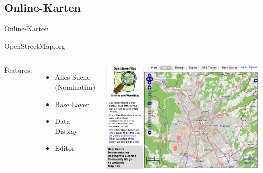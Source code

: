 \documentclass{beamer}
\begin{document}
\subsection{Online-Karten}

\begin{frame}{Online-Karten}

OpenStreetMap.org

\begin{columns}[c] %
Features:

  \begin{itemize}
    \item Alles-Suche (Nominatim)
    \item Base Layer
    \item Data Display
    \item Editor
  \end{itemize}

\includegraphics[width=.65\paperwidth]{osm.png}
\end{columns}


\end{frame}
\end{document}
